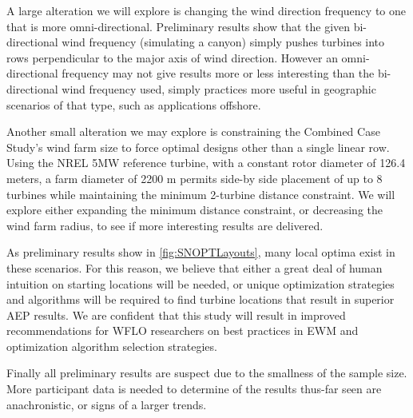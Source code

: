 \documentclass[]{aiaa-tc}
\begin{document}
A large alteration we will explore is changing the wind direction frequency to one that is more omni-directional. Preliminary results show that the given bi-directional wind frequency (simulating a canyon) simply pushes turbines into rows perpendicular to the major axis of wind direction. However an omni-directional frequency may not give results more or less interesting than the bi-directional wind frequency used, simply practices more useful in geographic scenarios of that type, such as applications offshore.

Another small alteration we may explore is constraining the Combined Case Study's wind farm size to force optimal designs other than a single linear row. Using the NREL 5MW reference turbine, with a constant rotor diameter of 126.4 meters, a farm diameter of 2200 m permits side-by side placement of up to 8 turbines while maintaining the minimum 2-turbine distance constraint. We will explore either expanding the minimum distance constraint, or decreasing the wind farm radius, to see if more interesting results are delivered.



As preliminary results show in \cref{fig:SNOPTLayouts}, many local optima exist in these scenarios. For this reason, we believe that either a great deal of human intuition on starting locations will be needed, or unique optimization strategies and algorithms will be required to find turbine locations that result in superior AEP results. We are confident that this study will result in improved recommendations for WFLO researchers on best practices in EWM and optimization algorithm selection strategies.

Finally all preliminary results are suspect due to the smallness of the sample size. More participant data is needed to determine of the results thus-far seen are anachronistic, or signs of a larger trends.

\pagebreak


\end{document}
